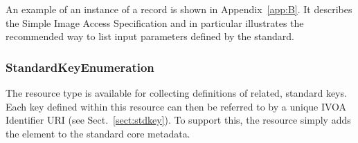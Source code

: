 \documentclass[11pt,a4paper]{ivoa}
\begin{document}
An example of an instance of a 
record is shown in Appendix~\ref{app:B}.  It describes the
Simple Image Access Specification and
in particular illustrates the recommended way to list input parameters
defined by the standard.  



\subsubsection{StandardKeyEnumeration}

The  resource type is available
for collecting definitions of related, standard keys.  Each key defined
within this resource can then be referred to by a unique IVOA
Identifier URI (see Sect.~\ref{sect:stdkey}).  To support
this, the  resource simply
adds the  element to the standard core
metadata.  
\end{document}
